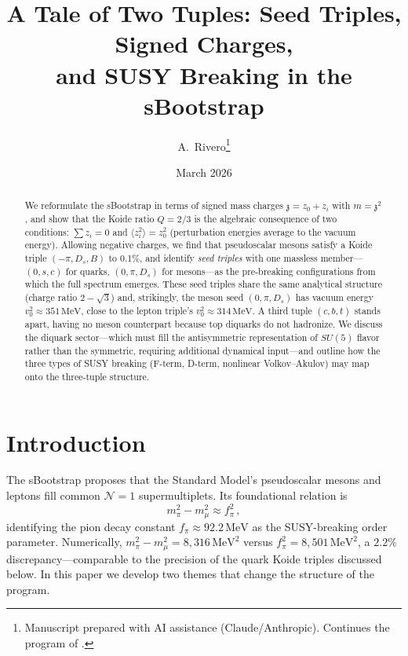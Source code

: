 \documentclass[12pt,a4paper]{article}
\title{A Tale of Two Tuples: Seed Triples, Signed Charges, \\
and SUSY Breaking in the sBootstrap}
\author{A.~Rivero\thanks{Manuscript prepared with AI assistance (Claude/Anthropic). 
Continues the program of \cite{Rivero2005,Rivero2012}.}}
\date{March 2026}
\newcommand{\MeV}{\,\text{MeV}}
\newcommand{\zch}{\mathfrak{z}}
\begin{document}
\maketitle

\begin{abstract}
We reformulate the sBootstrap in terms of signed mass charges 
$\zch = z_0 + z_i$ with $m = \zch^2$, and show that the Koide ratio 
$Q = 2/3$ is the algebraic consequence of two conditions: 
$\sum z_i = 0$ and $\langle z_i^2\rangle = z_0^2$ (perturbation 
energies average to the vacuum energy). Allowing negative charges, 
we find that pseudoscalar mesons satisfy a Koide triple 
$(-\pi, D_s, B)$ to 0.1\%, and identify \emph{seed triples} with 
one massless member---$(0, s, c)$ for quarks, $(0, \pi, D_s)$ for 
mesons---as the pre-breaking configurations from which the full 
spectrum emerges. These seed triples share the same analytical 
structure (charge ratio $2-\sqrt{3}$) and, strikingly, the meson 
seed $(0,\pi,D_s)$ has vacuum energy $v_0^2 \approx 351\MeV$, 
close to the lepton triple's $v_0^2 \approx 314\MeV$. A third 
tuple $(c,b,t)$ stands apart, having no meson counterpart because 
top diquarks do not hadronize. We discuss the diquark sector---which 
must fill the antisymmetric representation of $SU(5)$ flavor rather 
than the symmetric, requiring additional dynamical input---and outline 
how the three types of SUSY breaking (F-term, D-term, nonlinear 
Volkov--Akulov) may map onto the three-tuple structure.
\end{abstract}

\tableofcontents

\section{Introduction}
\label{sec:intro}

The sBootstrap \cite{Rivero2005,Rivero2012} proposes that the Standard 
Model's pseudoscalar mesons and leptons fill common $\mathcal{N}=1$ 
supermultiplets. Its foundational relation is
\begin{equation}
\label{eq:pimu}
m_\pi^2 - m_\mu^2 \approx f_\pi^2\,,
\end{equation}
identifying the pion decay constant $f_\pi \approx 92.2\MeV$ as the 
SUSY-breaking order parameter. Numerically, $m_\pi^2 - m_\mu^2 = 
8{,}316\MeV^2$ versus $f_\pi^2 = 8{,}501\MeV^2$, a $2.2\%$ 
discrepancy---comparable to the precision of the quark Koide triples 
discussed below. In this paper we develop two themes 
that change the structure of the program.
\end{document}
